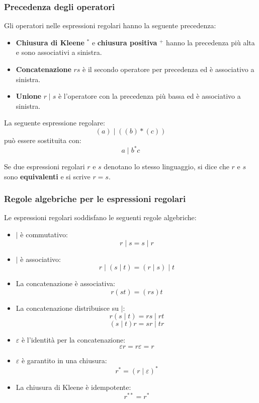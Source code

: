 \documentclass[a4paper]{article}
\begin{document}
\subsubsection{Precedenza degli operatori}
Gli operatori nelle espressioni regolari hanno la seguente precedenza:
\begin{itemize}
  \item \textbf{Chiusura di Kleene} \( ^* \) e \textbf{chiusura positiva} \( ^+ \) hanno
    la precedenza più alta e sono associativi a sinistra.

  \item \textbf{Concatenazione} \( rs \) è il secondo operatore per precedenza ed è
    associativo a sinistra.

  \item \textbf{Unione} \( r \mid  s \) è l'operatore con la precedenza più bassa ed è
    associativo a sinistra.
\end{itemize}

\begin{example}
  La seguente espressione regolare:
  \[
    ( a ) \mid ( ( b )*( c ) )
  \] 
  può essere sostituita con:
  \[
    a \mid b^* c
  \] 
\end{example}

\noindent
Se due espressioni regolari \( r \) e \( s \) denotano lo stesso linguaggio, si dice
che \( r \) e \( s \) sono \textbf{equivalenti} e si scrive \( r = s \).

\subsubsection{Regole algebriche per le espressioni regolari}
Le espressioni regolari soddisfano le seguenti regole algebriche:
\begin{itemize}
  \item \(  \mid  \) è commutativo:
    \[
      r \mid s = s \mid r
    \] 

  \item \(  \mid  \) è associativo:
    \[
      r \mid (s \mid t) = (r \mid s) \mid t
    \]

  \item La concatenazione è associativa:
    \[
      r(s t) = (r s) t
    \]

  \item La concatenazione distribuisce su \(  \mid  \):
    \[
      r(s \mid t) = r s \mid r t
    \] 
    \[
      (s \mid t) r = s r \mid t r
    \]

  \item \( \varepsilon  \) è l'identità per la concatenazione:
    \[
      \varepsilon r = r \varepsilon  = r
    \]

  \item \( \varepsilon  \) è garantito in una chiusura:
    \[
      r^* = (r \mid \varepsilon  )^*
    \]

  \item La chiusura di Kleene è idempotente:
    \[
      r^{**} = r^*
    \]
\end{itemize}
\end{document}
